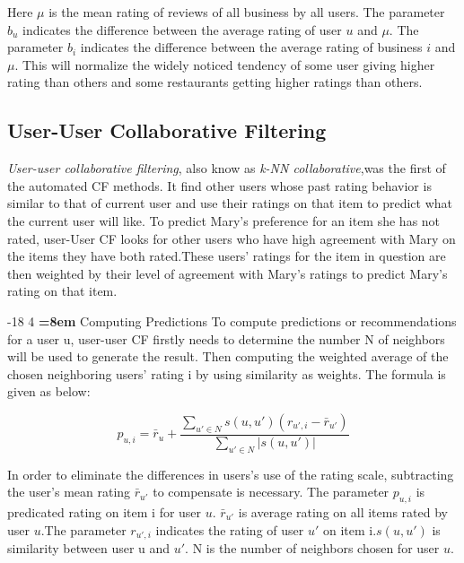 \documentclass{llncs}
\makeatletter
\renewcommand\subsubsection{\@startsection{subsubsection}{3}{\z@}%
	{-18\p@ \@plus -4\p@ \@minus -4\p@}%
	{4\p@ \@plus 2\p@ \@minus 2\p@}%
	{\normalfont\normalsize\bfseries\boldmath
		\rightskip=\z@ \@plus 8em\pretolerance=10000 }}
\makeatother
\begin{document}
Here $\mu$ is the mean rating of reviews of all business by all users. The parameter $b_{u}$ indicates the difference between the average rating of user $u$ and $\mu$. The parameter $b_i$ indicates the difference between the average rating of business $i$ and $\mu$. This will normalize the widely noticed tendency of some user giving higher rating than others and some restaurants getting higher ratings than others.


\subsection{User-User Collaborative Filtering}
\textit{User-user collaborative filtering}, also know as \textit{k-NN collaborative},was the first of the automated CF methods. It find other users whose past rating behavior is similar to that of current user and
use their ratings on that item to predict what the current user will like. To predict Mary's preference for an item she has not rated, user-User CF looks for other users who have high agreement with Mary on the items they have both rated.These users’ ratings for the item in question are then weighted by their level of agreement with Mary’s ratings to predict Mary's rating on that item. 

\subsubsection{Computing Predictions}
To compute predictions or recommendations for a user u, user-user CF firstly needs to determine the number N of neighbors will be used to generate the result. Then computing the weighted average of the chosen neighboring users' rating i by using similarity as weights. The formula is given as below:

\begin{equation}
p_{u,i} ={\bar r_{u}}  + \frac
{\sum\nolimits_{u' \in N} s(u,u')(r_{u',i} - {\bar r_{u'}})} 
{\sum\nolimits_{u' \in N} |s(u,u')|}
\end{equation}

In order to eliminate the differences in users's use of the rating scale, subtracting the user's mean rating ${\bar r_{u'}}$ to compensate is necessary.   The parameter $p_{u,i}$ is predicated rating on item i for user $u$.  ${\bar r_{u'}}$ is average rating on all items rated by user $u$.The parameter $r_{u',i}$ indicates the rating of user $u'$ on item i.$s(u,u')$ is similarity between user u and $u'$. N is the number of neighbors chosen for user $u$.  
\end{document}
